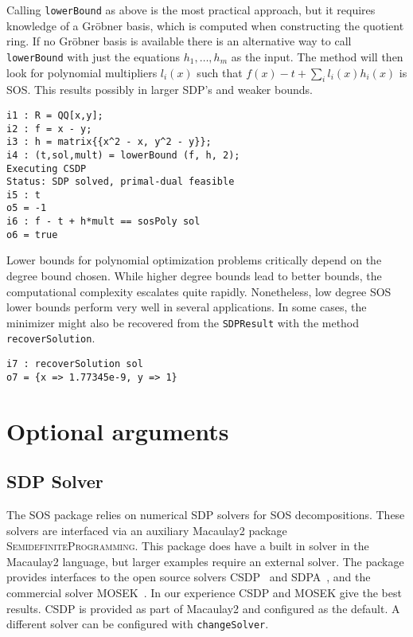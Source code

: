 \documentclass[11pt]{amsart}
\theoremstyle{plain}%
\theoremstyle{definition}
\theoremstyle{remark}
\newcommand{\Mac}{Macaulay2\xspace}
\newcommand{\SOS}{\textsc{SOS}\xspace}
\newcommand{\SDP}{\textsc{SemidefiniteProgramming}\xspace}
\begin{document}
Calling \verb|lowerBound| as above is the most practical approach, but it requires knowledge of a Gröbner basis, which is computed when constructing the quotient ring.
If no Gröbner basis is available there is an alternative way to call \verb|lowerBound| with just the equations $h_1,\dots,h_m$ as the input.
The method will then look for polynomial multipliers $l_i(x)$ such that $f(x) - t + \sum_i l_i(x)h_i(x)$ is SOS.
This results possibly in larger SDP's and weaker bounds.

{\small
\begin{verbatim}
i1 : R = QQ[x,y];
i2 : f = x - y;
i3 : h = matrix{{x^2 - x, y^2 - y}};
i4 : (t,sol,mult) = lowerBound (f, h, 2);
Executing CSDP
Status: SDP solved, primal-dual feasible
i5 : t
o5 = -1
i6 : f - t + h*mult == sosPoly sol
o6 = true
\end{verbatim}
}

Lower bounds for polynomial optimization problems critically depend on the degree bound chosen.
While higher degree bounds lead to better bounds, the computational complexity escalates quite rapidly.
Nonetheless, low degree SOS lower bounds perform very well in several applications.
In some cases, the minimizer might also be recovered from the \verb|SDPResult| with the method \verb|recoverSolution|.

{\small
\begin{verbatim}
i7 : recoverSolution sol
o7 = {x => 1.77345e-9, y => 1}
\end{verbatim}
}

\section{Optional arguments}
\label{s:arguments}

\subsection*{SDP Solver}
The \SOS package relies on numerical SDP solvers for SOS decompositions.
These solvers are interfaced via an auxiliary Macaulay2 package \SDP.
This package does have a built in solver in the \Mac language, but larger examples require an external solver.
The package provides interfaces to the open source solvers CSDP~\cite{borchers1999csdp} and SDPA~\cite{yamashita2003implementation}, and the commercial solver MOSEK~\cite{mosek}.
In our experience CSDP and MOSEK give the best results.
CSDP is provided as part of \Mac and configured as the default.
A different solver can be configured with \verb|changeSolver|.
\end{document}
